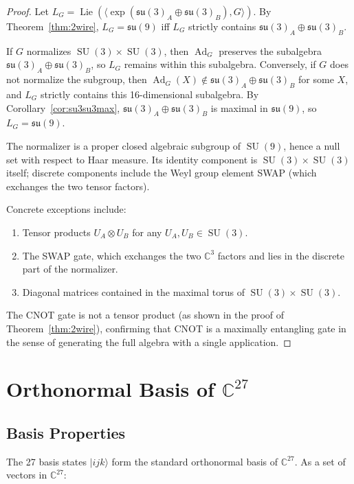 \documentclass[12pt,a4paper]{article}
\newcommand{\Ad}{\operatorname{Ad}}
\newcommand{\Lie}{\operatorname{Lie}}
\newcommand{\SU}{\operatorname{SU}}
\begin{document}
\begin{proof}
Let $L_G = \Lie(\langle \exp(\mathfrak{su}(3)_A\oplus\mathfrak{su}(3)_B),
G \rangle)$. By Theorem~\ref{thm:2wire}, $L_G = \mathfrak{su}(9)$ iff
$L_G$ strictly contains $\mathfrak{su}(3)_A\oplus\mathfrak{su}(3)_B$.

If $G$ normalizes $\SU(3)\times \SU(3)$, then $\Ad_G$ preserves the
subalgebra $\mathfrak{su}(3)_A\oplus\mathfrak{su}(3)_B$, so $L_G$
remains within this subalgebra. Conversely, if $G$ does not normalize
the subgroup, then $\Ad_G(X) \notin \mathfrak{su}(3)_A\oplus
\mathfrak{su}(3)_B$ for some $X$, and $L_G$ strictly contains this
16-dimensional subalgebra. By Corollary~\ref{cor:su3su3max},
$\mathfrak{su}(3)_A\oplus\mathfrak{su}(3)_B$ is maximal in
$\mathfrak{su}(9)$, so $L_G = \mathfrak{su}(9)$.

The normalizer is a proper closed algebraic subgroup of $\SU(9)$,
hence a null set with respect to Haar measure. Its identity component
is $\SU(3)\times \SU(3)$ itself; discrete components include the Weyl
group element SWAP (which exchanges the two tensor factors).

Concrete exceptions include:
\begin{enumerate}
\item Tensor products $U_A \otimes U_B$ for any $U_A,U_B \in \SU(3)$.
\item The SWAP gate, which exchanges the two $\mathbb{C}^3$ factors
and lies in the discrete part of the normalizer.
\item Diagonal matrices contained in the maximal torus of
$\SU(3)\times \SU(3)$.
\end{enumerate}

The CNOT gate is not a tensor product (as shown in the proof of
Theorem~\ref{thm:2wire}), confirming that CNOT is a maximally entangling
gate in the sense of generating the full algebra with a single application.
\end{proof}

\section{Orthonormal Basis of $\mathbb{C}^{27}$}

\subsection{Basis Properties}

The 27 basis states $|ijk\rangle$ form the standard orthonormal basis
of $\mathbb{C}^{27}$. As a set of vectors in $\mathbb{C}^{27}$:
\end{document}
